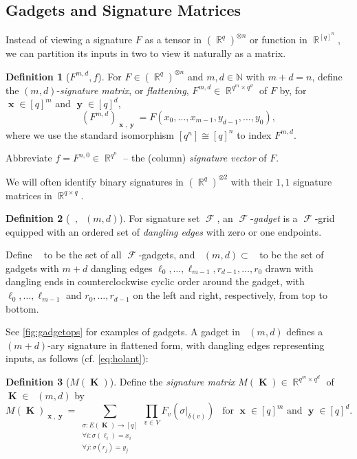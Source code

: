 \documentclass{article}
\theoremstyle{remark}
\theoremstyle{definition}
\newtheorem{definition}{Definition}[section]
\DeclareMathOperator{\rr}{\mathbb{R}}
\DeclareMathOperator{\vk}{\mathbf{K}}
\DeclareMathOperator{\vx}{\mathbf{x}}
\DeclareMathOperator{\vy}{\mathbf{y}}
\DeclareMathOperator{\fc}{\mathcal{F}}
\DeclareMathOperator{\gk}{\mathfrak{G}_{\mathcal{F}}}
\begin{document}
\subsection{Gadgets and Signature Matrices}
Instead of viewing a signature $F$ as a tensor in $(\rr^q)^{\otimes n}$ or function in $\rr^{[q]^n}$,
we can partition its inputs in two to view it naturally as a matrix.
\begin{definition}[$F^{m,d},f$]
    \label{def:sig_matrix}
    For $F \in (\rr^q)^{\otimes n}$ and $m,d \in \mathbb{N}$ with $m+d=n$, define the 
    $(m,d)$-\emph{signature matrix}, or \emph{flattening}, $F^{m,d} \in \rr^{q^m\times q^d}$ of $F$
    by, for $\vx \in [q]^m$ and $\vy \in [q]^d$,
    \[
        (F^{m,d})_{\vx,\vy} = F(x_0,\ldots,x_{m-1},y_{d-1},\ldots,y_0),
    \]
    where we use the standard isomorphism $[q^n] \cong [q]^n$ to index $F^{m,d}$.

    Abbreviate $f = F^{n,0} \in \rr^{q^n}$ -- the (column) \emph{signature vector} of $F$.
\end{definition}
We will often identify binary signatures in $(\rr^q)^{\otimes 2}$
with their $1,1$ signature matrices in $\rr^{q \times q}$.
\begin{definition}[$\gk,\gk(m,d)$]
    For signature set $\fc$, an $\fc$-\emph{gadget} is a $\fc$-grid equipped with an ordered set of
    \emph{dangling edges} with zero or one endpoints.

    Define $\gk$ to be the set of all $\fc$-gadgets, and $\gk(m,d) \subset \gk$ to be the set of gadgets
    with $m+d$ dangling edges $\ell_0, \ldots, \ell_{m-1}, r_{d-1}, \ldots, r_0$ drawn with dangling
    ends in counterclockwise cyclic order around the gadget, with
    $\ell_0, \ldots, \ell_{m-1}$ and $r_{0}, \ldots, r_{d-1}$ on the left 
    and right, respectively, from top to bottom.
\end{definition}
See \autoref{fig:gadgetops} for examples of gadgets.
A gadget in $\gk(m,d)$ defines a $(m+d)$-ary signature in flattened form, with dangling edges representing
inputs, as follows (cf. \eqref{eq:holant}):
\begin{definition}[$M(\vk)$]
    \label{def:gadget_sig_matrix}
    Define the \emph{signature matrix} $M(\vk) \in \rr^{q^m \times q^d}$ of $\vk \in \gk(m,d)$ by
    \[
        M(\vk)_{\vx,\vy} = \sum_{\substack{\sigma: E(\vk) \to [q] \\ \forall i: \sigma(\ell_i) = x_i 
        \\ \forall j: \sigma(r_j) = y_{j}}}\prod_{v \in V} F_v(\sigma|_{\delta(v)})
        ~~\text{ for $\vx \in [q]^m$ and $\vy \in [q]^d$}.
    \]
\end{definition}
\end{document}
